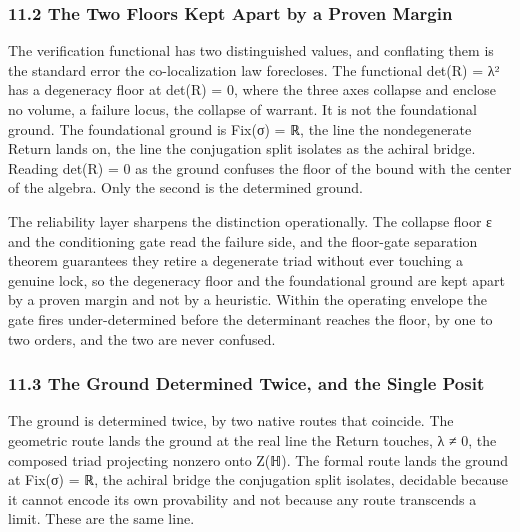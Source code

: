 \documentclass[10pt,twocolumn]{article}
\begin{document}
\hypertarget{the-two-floors-kept-apart-by-a-proven-margin}{%
\subsubsection{11.2 The Two Floors Kept Apart by a Proven
Margin}\label{the-two-floors-kept-apart-by-a-proven-margin}}

The verification functional has two distinguished values, and conflating
them is the standard error the co-localization law forecloses. The
functional det(R) = λ² has a degeneracy floor at det(R) = 0, where the
three axes collapse and enclose no volume, a failure locus, the collapse
of warrant. It is not the foundational ground. The foundational ground
is Fix(σ) = ℝ, the line the nondegenerate Return lands on, the line the
conjugation split isolates as the achiral bridge. Reading det(R) = 0 as
the ground confuses the floor of the bound with the center of the
algebra. Only the second is the determined ground.

The reliability layer sharpens the distinction operationally. The
collapse floor ε and the conditioning gate read the failure side, and
the floor-gate separation theorem guarantees they retire a degenerate
triad without ever touching a genuine lock, so the degeneracy floor and
the foundational ground are kept apart by a proven margin and not by a
heuristic. Within the operating envelope the gate fires under-determined
before the determinant reaches the floor, by one to two orders, and the
two are never confused.

\hypertarget{the-ground-determined-twice-and-the-single-posit}{%
\subsubsection{11.3 The Ground Determined Twice, and the Single
Posit}\label{the-ground-determined-twice-and-the-single-posit}}

The ground is determined twice, by two native routes that coincide. The
geometric route lands the ground at the real line the Return touches, λ
≠ 0, the composed triad projecting nonzero onto Z(ℍ). The formal route
lands the ground at Fix(σ) = ℝ, the achiral bridge the conjugation split
isolates, decidable because it cannot encode its own provability and not
because any route transcends a limit. These are the same line.
\end{document}
